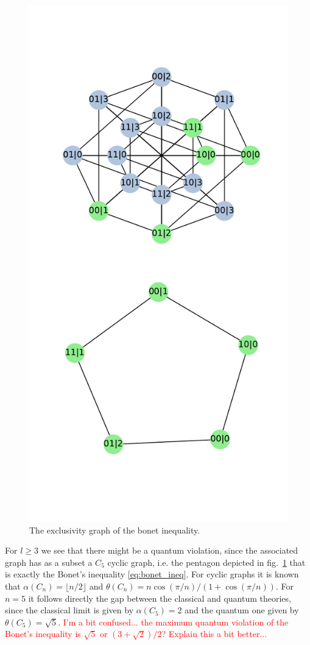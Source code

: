 \documentclass[letterpaper]{article}
\begin{document}
\begin{figure}[h]
    \centering
    \includegraphics[width=.8\columnwidth]{images/instrumental_c5.pdf}
    \caption{The exclusivity graph of the bonet inequality.}
    \label{fig:bonetexc}
\end{figure}

For $l\ge3$ we see that there might be a quantum violation, since the associated graph has as a subset a $C_5$ cyclic graph, i.e. the pentagon depicted in
fig.~\ref{fig:bonetexc} that is exactly the Bonet's inequality \eqref{eq:bonet_ineq}.
For cyclic graphs it is known that $\alpha(C_n) = \lfloor n/2 \rfloor$ and $\theta(C_n) = n\cos(\pi/n)/(1+\cos(\pi/n))$. For $n=5$ it follows directly the gap between the classical and quantum theories, since the classical limit is given by $\alpha(C_5)=2$ and the quantum one given by $\theta(C_5)=\sqrt{5}$.
\textcolor{red}{I'm a bit confused... the maximum quantum violation of the Bonet's inequality is $\sqrt{5}$ or $(3+\sqrt{2})/2$? Explain this a bit better...}
\end{document}
